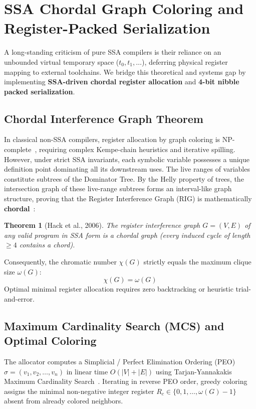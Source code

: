 \documentclass{ieeeaccess}
\newtheorem{theorem}{Theorem}
\begin{document}
\section{SSA Chordal Graph Coloring and Register-Packed Serialization}
\label{sec:register_alloc} %

A long-standing criticism of pure SSA compilers is their reliance on an unbounded virtual temporary space ($t_0, t_1, \dots$), deferring physical register mapping to external toolchains. We bridge this theoretical and systems gap by implementing \textbf{SSA-driven chordal register allocation} and \textbf{4-bit nibble packed serialization}.

\subsection{Chordal Interference Graph Theorem}
In classical non-SSA compilers, register allocation by graph coloring is NP-complete~\cite{chaitin1982register}, requiring complex Kempe-chain heuristics and iterative spilling. However, under strict SSA invariants, each symbolic variable possesses a unique definition point dominating all its downstream uses. The live ranges of variables constitute subtrees of the Dominator Tree. By the Helly property of trees, the intersection graph of these live-range subtrees forms an interval-like graph structure, proving that the Register Interference Graph (RIG) is mathematically \textbf{chordal}~\cite{hack2006register,pereira2005register}:
\begin{theorem}[Hack et al., 2006]
The register interference graph $G = (V, E)$ of any valid program in SSA form is a chordal graph (every induced cycle of length $\ge 4$ contains a chord).
\end{theorem}
Consequently, the chromatic number $\chi(G)$ strictly equals the maximum clique size $\omega(G)$:
\begin{equation}
\chi(G) = \omega(G)
\end{equation}
Optimal minimal register allocation requires zero backtracking or heuristic trial-and-error.

\subsection{Maximum Cardinality Search (MCS) and Optimal Coloring}
The allocator computes a Simplicial / Perfect Elimination Ordering (PEO) $\sigma = (v_1, v_2, \dots, v_n)$ in linear time $O(|V| + |E|)$ using Tarjan-Yannakakis Maximum Cardinality Search~\cite{tarjan1984simple}. Iterating in reverse PEO order, greedy coloring assigns the minimal non-negative integer register $R_c \in \{0, 1, \dots, \omega(G)-1\}$ absent from already colored neighbors.
\end{document}
